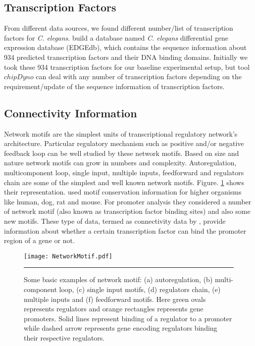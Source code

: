 \subsection{Transcription Factors}
From different data sources, we found different number/list of transcription factors for \textit{C. elegans}. \cite{Inmaculada:2007} build a database named \textit{C. elegans} differential gene expression database (EDGEdb), which contains the sequence information about 934 predicted transcription factors and their DNA binding domains. Initially we took these 934 transcription factors for our baseline experimental setup, but tool $chipDyno$ can deal with any number of transcription factors depending on the requirement/update of the sequence information of transcription factors.

\subsection{Connectivity Information}
Network motifs are the simplest units of transcriptional regulatory network's architecture. Particular regulatory mechanism such as positive and/or negative feedback loop can be well studied by these network motifs. Based on size and nature network motifs can grow in numbers and complexity. Autoregulation, multicomponent loop, single input, multiple inputs, feedforward and regulators chain are some of the simplest and well known network motifs. Figure. \ref{fig:networkMotif} shows their representation. \cite{Xie:2005} used motif conservation information for higher organisms like human, dog, rat and mouse. For promoter analysis they considered a number of network motif (also known as transcription factor binding sites) and also some new motifs. These type of data, termed as connectivity data by \cite{Liao:2003}, provide information about whether a certain transcription factor can bind the promoter region of a gene or not.

\begin{figure}
	\centering
		\texttt{[image: NetworkMotif.pdf]}
		\rule{35em}{0.5pt}
	\caption[Basic examples of network motif]
		{Some basic examples of network motif: (a) autoregulation, (b) multi-component loop, (c) single input motifs, (d) regulators chain, (e) multiple inputs and (f) feedforward motifs. Here green ovals represents regulators and orange rectangles represents gene promoters. Solid lines represent binding of a regulator to a promoter while dashed arrow represents gene encoding regulators binding their respective regulators.}
	\label{fig:networkMotif}
\end{figure}

